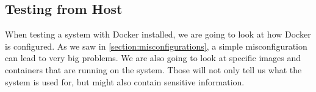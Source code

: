 \subsection{Testing from Host}
When testing a system with Docker installed, we are going to look at how Docker is configured. As we saw in \autoref{section:misconfigurations}, a simple misconfiguration can lead to very big problems. We are also going to look at specific images and containers that are running on the system. Those will not only tell us what the system is used for, but might also contain sensitive information.






